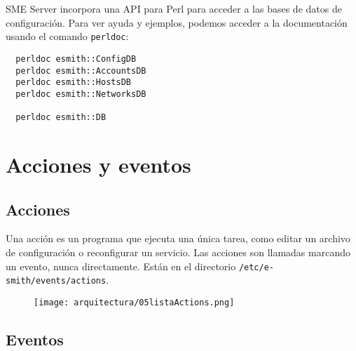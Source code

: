SME Server incorpora una API para Perl para acceder a las bases de datos de configuración. Para ver ayuda y ejemplos, podemos acceder a la documentación usando el comando \lstinline!perldoc!:

\begin{lstlisting}
  perldoc esmith::ConfigDB
  perldoc esmith::AccountsDB
  perldoc esmith::HostsDB
  perldoc esmith::NetworksDB

  perldoc esmith::DB
\end{lstlisting}

\begin{comment}
Script para consultar el usuario admin:

\begin{lstlisting}[language=Perl,style=perlo]
#!/usr/bin/perl -w
  
use esmith::AccountsDB;

my $db = esmith::AccountsDB->open or die "No se puede abrir la BD Accounts\n";

my $admin = $db->get("admin") or die "No existe la cuenta admin en la BD ACcounts\n";

print $admin->show();
\end{lstlisting}
\end{comment}

%
%
\section{Acciones y eventos}

\subsection{Acciones}

Una acción es un programa que ejecuta una única tarea, como editar un archivo de configuración o reconfigurar un servicio. Las acciones son llamadas marcando un evento, nunca directamente. Están en el directorio \lstinline!/etc/e-smith/events/actions!.

\begin{figure}[H]
    \centering
    \texttt{[image: arquitectura/05listaActions.png]}
\end{figure}

\subsection{Eventos}

